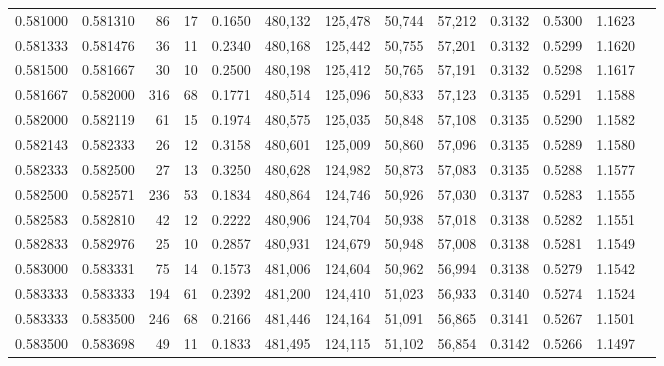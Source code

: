 \begin{tabular}{rrrrrrrrrrrrr}
0.581000 & 0.581310 &    86 &  17 &                                     0.1650 & 480,132 & 125,478 &  50,744 &  57,212 & 0.3132 & 0.5300 & 1.1623 \\
0.581333 & 0.581476 &    36 &  11 &                                     0.2340 & 480,168 & 125,442 &  50,755 &  57,201 & 0.3132 & 0.5299 & 1.1620 \\
0.581500 & 0.581667 &    30 &  10 &                                     0.2500 & 480,198 & 125,412 &  50,765 &  57,191 & 0.3132 & 0.5298 & 1.1617 \\
0.581667 & 0.582000 &   316 &  68 &                                     0.1771 & 480,514 & 125,096 &  50,833 &  57,123 & 0.3135 & 0.5291 & 1.1588 \\
0.582000 & 0.582119 &    61 &  15 &                                     0.1974 & 480,575 & 125,035 &  50,848 &  57,108 & 0.3135 & 0.5290 & 1.1582 \\
0.582143 & 0.582333 &    26 &  12 &                                     0.3158 & 480,601 & 125,009 &  50,860 &  57,096 & 0.3135 & 0.5289 & 1.1580 \\
0.582333 & 0.582500 &    27 &  13 &                                     0.3250 & 480,628 & 124,982 &  50,873 &  57,083 & 0.3135 & 0.5288 & 1.1577 \\
0.582500 & 0.582571 &   236 &  53 &                                     0.1834 & 480,864 & 124,746 &  50,926 &  57,030 & 0.3137 & 0.5283 & 1.1555 \\
0.582583 & 0.582810 &    42 &  12 &                                     0.2222 & 480,906 & 124,704 &  50,938 &  57,018 & 0.3138 & 0.5282 & 1.1551 \\
0.582833 & 0.582976 &    25 &  10 &                                     0.2857 & 480,931 & 124,679 &  50,948 &  57,008 & 0.3138 & 0.5281 & 1.1549 \\
0.583000 & 0.583331 &    75 &  14 &                                     0.1573 & 481,006 & 124,604 &  50,962 &  56,994 & 0.3138 & 0.5279 & 1.1542 \\
0.583333 & 0.583333 &   194 &  61 &                                     0.2392 & 481,200 & 124,410 &  51,023 &  56,933 & 0.3140 & 0.5274 & 1.1524 \\
0.583333 & 0.583500 &   246 &  68 &                                     0.2166 & 481,446 & 124,164 &  51,091 &  56,865 & 0.3141 & 0.5267 & 1.1501 \\
0.583500 & 0.583698 &    49 &  11 &                                     0.1833 & 481,495 & 124,115 &  51,102 &  56,854 & 0.3142 & 0.5266 & 1.1497 \\

\end{tabular}
